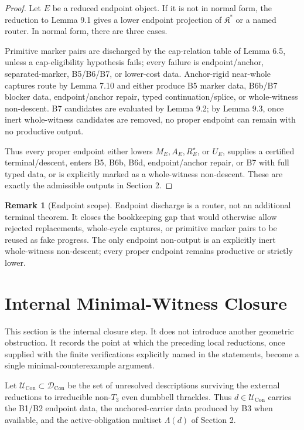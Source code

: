 \documentclass[11pt]{amsart}
\theoremstyle{definition}
\newtheorem{remark}[theorem]{Remark}
\begin{document}
\begin{proof}
Let \(E\) be a reduced endpoint object. If it is not in normal form, the reduction to Lemma 9.1 gives a lower endpoint projection of \(\mathfrak K^\ast\) or a named router. In normal form, there are three cases.

Primitive marker pairs are discharged by the cap-relation table of Lemma 6.5, unless a cap-eligibility hypothesis fails; every failure is endpoint/anchor, separated-marker, B5/B6/B7, or lower-cost data. Anchor-rigid near-whole captures route by Lemma 7.10 and either produce B5 marker data, B6b/B7 blocker data, endpoint/anchor repair, typed continuation/splice, or whole-witness non-descent. B7 candidates are evaluated by Lemma 9.2; by Lemma 9.3, once inert whole-witness candidates are removed, no proper endpoint can remain with no productive output.

Thus every proper endpoint either lowers \(M_E,A_E,R_E^\star\), or \(U_E\), supplies a certified terminal/descent, enters B5, B6b, B6d, endpoint/anchor repair, or B7 with full typed data, or is explicitly marked as a whole-witness non-descent. These are exactly the admissible outputs in Section 2.

\end{proof}
\begin{remark}[Endpoint scope]
Endpoint discharge is a router, not an additional terminal theorem. It closes the bookkeeping gap that would otherwise allow rejected replacements, whole-cycle captures, or primitive marker pairs to be reused as fake progress. The only endpoint non-output is an explicitly inert whole-witness non-descent; every proper endpoint remains productive or strictly lower.

\end{remark}
\section{Internal Minimal-Witness Closure}

This section is the internal closure step. It does not introduce another
geometric obstruction. It records the point at which the preceding local
reductions, once supplied with the finite verifications explicitly named in the
statements, become a single minimal-counterexample argument.

Let \(\mathcal U_{\mathrm{Con}}\subset\mathcal D_{\mathrm{Con}}\) be the set of
unresolved descriptions surviving the external reductions to irreducible
non-\(T_3\) even dumbbell thrackles. Thus \(d\in\mathcal U_{\mathrm{Con}}\) carries
the B1/B2 endpoint data, the anchored-carrier data produced by B3 when
available, and the active-obligation multiset \(\Lambda(d)\) of Section 2.
\end{document}
